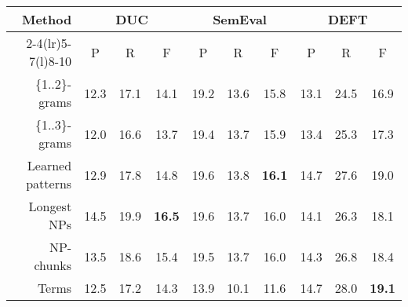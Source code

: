       \begin{table*}
        \centering
        \begin{tabular}{@{~}rccccccccc@{~}}
          \toprule
          \multirow{2}{*}[-2pt]{\textbf{Method}} & \multicolumn{3}{c}{\textbf{DUC}} & \multicolumn{3}{c}{\textbf{SemEval}} & \multicolumn{3}{c}{\textbf{DEFT}}\\
          \cmidrule(r){2-4}\cmidrule(lr){5-7}\cmidrule(l){8-10}
          & P & R & F & P & R & F & P & R & F\\
          \midrule
          \{1..2\}-grams & 12.3 & 17.1 & 14.1 & 19.2 & 13.6 & 15.8 & 13.1 & 24.5 & 16.9\\
          \{1..3\}-grams & 12.0 & 16.6 & 13.7 & 19.4 & 13.7 & 15.9 & 13.4 & 25.3 & 17.3\\
          Learned patterns & 12.9 & 17.8 & 14.8 & 19.6 & 13.8 & \textbf{16.1} & 14.7 & 27.6 & 19.0\\
          Longest NPs & 14.5 & 19.9 & \textbf{16.5} & 19.6 & 13.7 & 16.0 & 14.1 & 26.3 & 18.1\\
          NP-chunks & 13.5 & 18.6 & 15.4 & 19.5 & 13.7 & 16.0 & 14.3 & 26.8 & 18.4\\
          Terms & 12.5 & 17.2 & 14.3 & 13.9 & 10.1 & 11.6 & 14.7 & 28.0 & \textbf{19.1}\\
          \bottomrule
        \end{tabular}
        \caption{Comparison of candidate extraction methods, when extracting 10
                 keyphrases with \textbf{KEA}.
                 \label{tab:kea_results}}
      \end{table*}
